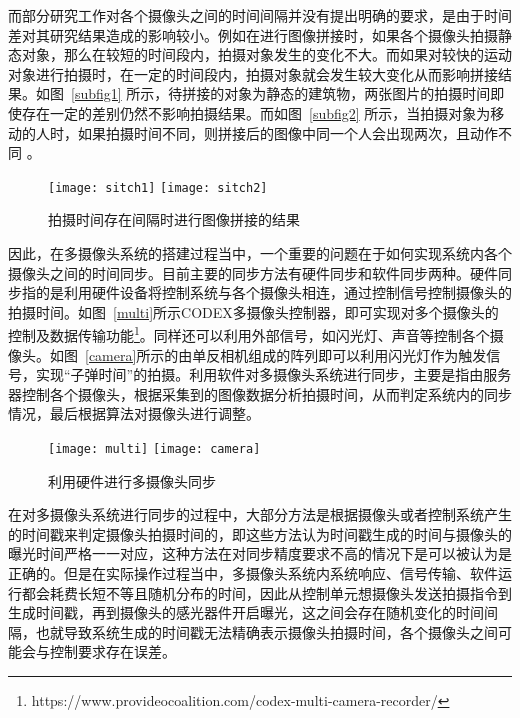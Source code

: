 而部分研究工作对各个摄像头之间的时间间隔并没有提出明确的要求，是由于时间差对其研究结果造成的影响较小。例如在进行图像拼接时，如果各个摄像头拍摄静态对象，那么在较短的时间段内，拍摄对象发生的变化不大。而如果对较快的运动对象进行拍摄时，在一定的时间段内，拍摄对象就会发生较大变化从而影响拼接结果。如图~\ref{subfig1} 所示，待拼接的对象为静态的建筑物，两张图片的拍摄时间即使存在一定的差别仍然不影响拍摄结果。而如图~\ref{subfig2} 所示，当拍摄对象为移动的人时，如果拍摄时间不同，则拼接后的图像中同一个人会出现两次，且动作不同 \cite{2}。

\begin{figure}[h]
  \centering%
    {\texttt{[image: sitch1]}}
    \hspace{4em}%
      {\texttt{[image: sitch2]}}
  \caption{拍摄时间存在间隔时进行图像拼接的结果}
  \label{sitch}
\end{figure}

因此，在多摄像头系统的搭建过程当中，一个重要的问题在于如何实现系统内各个摄像头之间的时间同步。目前主要的同步方法有硬件同步和软件同步两种。硬件同步指的是利用硬件设备将控制系统与各个摄像头相连，通过控制信号控制摄像头的拍摄时间。如图~\ref{multi}所示CODEX多摄像头控制器，即可实现对多个摄像头的控制及数据传输功能\footnote{https://www.provideocoalition.com/codex-multi-camera-recorder/}。同样还可以利用外部信号，如闪光灯、声音等控制各个摄像头。如图~\ref{camera}所示的由单反相机组成的阵列即可以利用闪光灯作为触发信号，实现“子弹时间”的拍摄。利用软件对多摄像头系统进行同步，主要是指由服务器控制各个摄像头，根据采集到的图像数据分析拍摄时间，从而判定系统内的同步情况，最后根据算法对摄像头进行调整。

\begin{figure}[h]
  \centering%
    {\texttt{[image: multi]}}
    \hspace{4em}%
      {\texttt{[image: camera]}}
  \caption{利用硬件进行多摄像头同步}
\end{figure}

在对多摄像头系统进行同步的过程中，大部分方法是根据摄像头或者控制系统产生的时间戳来判定摄像头拍摄时间的，即这些方法认为时间戳生成的时间与摄像头的曝光时间严格一一对应，这种方法在对同步精度要求不高的情况下是可以被认为是正确的。但是在实际操作过程当中，多摄像头系统内系统响应、信号传输、软件运行都会耗费长短不等且随机分布的时间，因此从控制单元想摄像头发送拍摄指令到生成时间戳，再到摄像头的感光器件开启曝光，这之间会存在随机变化的时间间隔，也就导致系统生成的时间戳无法精确表示摄像头拍摄时间，各个摄像头之间可能会与控制要求存在误差。

